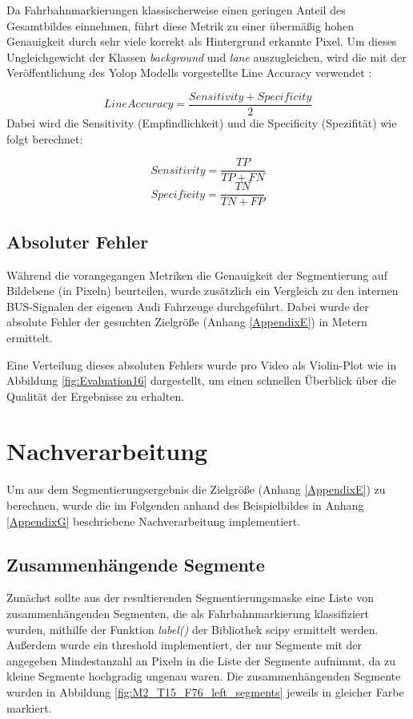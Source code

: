     Da Fahrbahnmarkierungen klassischerweise einen geringen Anteil des Gesamtbildes einnehmen, führt diese Metrik zu einer übermä{\ss}ig hohen Genauigkeit durch sehr viele korrekt als Hintergrund erkannte Pixel. Um dieses Ungleichgewicht der Klassen \textit{background} und \textit{lane} auszugleichen, wird die mit der Veröffentlichung des Yolop Modells vorgestellte Line Accuracy verwendet \cite{wang2023you}:

    \[
    Line Accuracy = \frac{Sensitivity + Specificity}{2}
    \]
    Dabei wird die Sensitivity (Empfindlichkeit) und die Specificity (Spezifität) wie folgt berechnet:

    \[
    Sensitivity = \frac{TP}{TP+FN}
    \]
    \[
    Specificity = \frac{TN}{TN+FP}
    \]

    \subsection{Absoluter Fehler}
        Während die vorangegangen Metriken die Genauigkeit der Segmentierung auf Bildebene (in Pixeln) beurteilen, wurde zusätzlich ein Vergleich zu den internen BUS-Signalen der eigenen Audi Fahrzeuge durchgeführt. 
        Dabei wurde der absolute Fehler der gesuchten Zielgrö{\ss}e (Anhang \ref{AppendixE}) in Metern ermittelt.

        Eine Verteilung dieses absoluten Fehlers wurde pro Video als Violin-Plot wie in Abbildung \ref{fig:Evaluation16} dargestellt, um einen schnellen Überblick über die Qualität der Ergebnisse zu erhalten. 



\section{Nachverarbeitung} %
\label{chapter_postprocessing}
Um aus dem Segmentierungsergebnis die Zielgrö{\ss}e (Anhang \ref{AppendixE}) zu berechnen, wurde die im Folgenden anhand des Beispielbildes in Anhang \ref{AppendixG} beschriebene Nachverarbeitung implementiert. 


\subsection{Zusammenhängende Segmente}
    Zunächst sollte aus der resultierenden Segmentierungsmaske eine Liste von zusammenhängenden Segmenten, die als Fahrbahnmarkierung klassifiziert wurden, mithilfe der Funktion \textit{label()} der Bibliothek scipy ermittelt werden. Au{\ss}erdem wurde ein threshold implementiert, der nur Segmente mit der angegeben Mindestanzahl an Pixeln in die Liste der Segmente aufnimmt, da zu kleine Segmente hochgradig ungenau waren.
    Die zusammenhängenden Segmente wurden in Abbildung \ref{fig:M2_T15_F76_left_segments} jeweils in gleicher Farbe markiert.


